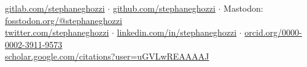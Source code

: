 \documentclass[a4paper,11pt,oneside]{article}
\begin{document}
\href{https://gitlab.com/stephaneghozzi}{gitlab.com/stephaneghozzi} $\cdot$ \href{https://github.com/stephaneghozzi}{github.com/stephaneghozzi} $\cdot$ Mastodon: \href{https://fosstodon.org/@stephaneghozzi}{fosstodon.org/@stephaneghozzi} \\ \href{https://twitter.com/stephaneghozzi}{twitter.com/stephaneghozzi} $\cdot$ \href{https://linkedin.com/in/stephaneghozzi}{linkedin.com/in/stephaneghozzi} $\cdot$ \href{https://orcid.org/0000-0002-3911-9573}{orcid.org/0000-0002-3911-9573} \\ \href{https://scholar.google.com/citations?user=uGVLwREAAAAJ}{scholar.google.com/citations?user=uGVLwREAAAAJ}

\vspace{1em}

\noindent {\color{gray}\hrule} 

\vspace{1em}
\end{document}
